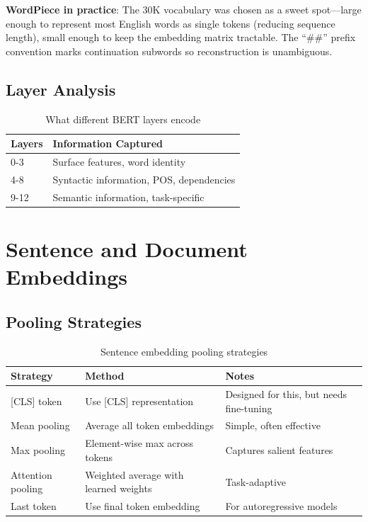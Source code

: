 \textbf{WordPiece in practice}: The 30K vocabulary was chosen as a sweet spot---large enough to represent most English words as single tokens (reducing sequence length), small enough to keep the embedding matrix tractable. The ``\#\#'' prefix convention marks continuation subwords so reconstruction is unambiguous.

\subsection{Layer Analysis}

\begin{table}[H]
\centering
\caption{What different BERT layers encode}
\begin{tabularx}{\textwidth}{lX}
\toprule
\textbf{Layers} & \textbf{Information Captured} \\
\midrule
0-3 & Surface features, word identity \\
4-8 & Syntactic information, POS, dependencies \\
9-12 & Semantic information, task-specific \\
\bottomrule
\end{tabularx}
\end{table}

\section{Sentence and Document Embeddings}
\label{sec:sentence_embeddings}

\subsection{Pooling Strategies}

\begin{table}[H]
\centering
\caption{Sentence embedding pooling strategies}
\begin{tabularx}{\textwidth}{lXX}
\toprule
\textbf{Strategy} & \textbf{Method} & \textbf{Notes} \\
\midrule
{[CLS]} token & Use {[CLS]} representation & Designed for this, but needs fine-tuning \\
Mean pooling & Average all token embeddings & Simple, often effective \\
Max pooling & Element-wise max across tokens & Captures salient features \\
Attention pooling & Weighted average with learned weights & Task-adaptive \\
Last token & Use final token embedding & For autoregressive models \\
\bottomrule
\end{tabularx}
\end{table}

